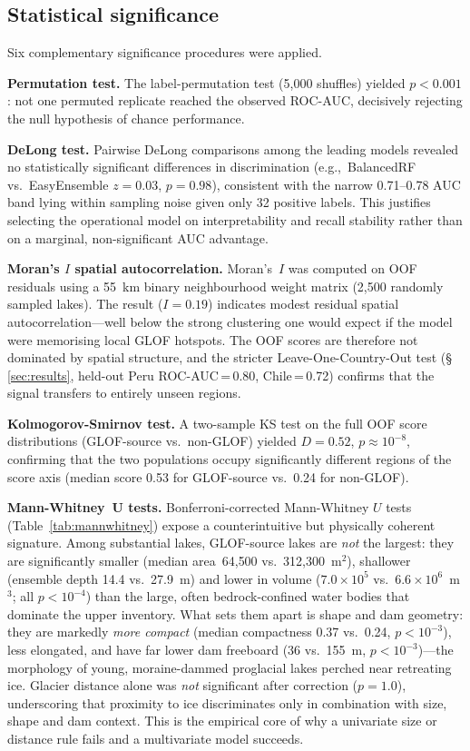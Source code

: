 \documentclass[pdflatex,sn-basic]{sn-jnl}%
\begin{document}
\subsection{Statistical significance}
\label{sec:stats}

Six complementary significance procedures were applied.

\textbf{Permutation test.}
The label-permutation test (5{,}000 shuffles) yielded $p<0.001$: not one
permuted replicate reached the observed ROC-AUC, decisively rejecting the
null hypothesis of chance performance.

\textbf{DeLong test.}
Pairwise DeLong comparisons \citep{DeLong1988} among the leading models
revealed no statistically significant differences in discrimination
(e.g.,\ BalancedRF vs.\ EasyEnsemble $z\!=\!0.03$, $p\!=\!0.98$),
consistent with the narrow 0.71--0.78 AUC band lying within sampling noise
given only 32 positive labels. This justifies selecting the operational
model on interpretability and recall stability rather than on a marginal,
non-significant AUC advantage.

\textbf{Moran's $I$ spatial autocorrelation.}
Moran's~$I$ was computed on OOF residuals using a 55~km binary
neighbourhood weight matrix (2{,}500 randomly sampled lakes).
The result ($I\!=\!0.19$) indicates modest residual spatial
autocorrelation---well below the strong clustering one
would expect if the model were memorising local GLOF hotspots. The OOF
scores are therefore not dominated by spatial structure, and the stricter
Leave-One-Country-Out test (\S\,\ref{sec:results}, held-out Peru
ROC-AUC\,=\,0.80, Chile\,=\,0.72) confirms that the signal transfers to
entirely unseen regions.

\textbf{Kolmogorov-Smirnov test.}
A two-sample KS test on the full OOF score distributions
(GLOF-source vs.\ non-GLOF) yielded $D\!=\!0.52$,
$p\!\approx\!10^{-8}$, confirming that the two populations occupy
significantly different regions of the score axis
(median score 0.53 for GLOF-source vs.\ 0.24 for non-GLOF).

\textbf{Mann-Whitney~U tests.}
Bonferroni-corrected Mann-Whitney $U$ tests
(Table~\ref{tab:mannwhitney}) expose a counterintuitive but physically
coherent signature. Among substantial lakes, GLOF-source lakes are
\emph{not} the largest: they are significantly smaller (median
area~64{,}500 vs.\ 312{,}300~m$^2$), shallower (ensemble depth 14.4 vs.\
27.9~m) and lower in volume ($7.0{\times}10^5$ vs.\ $6.6{\times}10^6$~m$^3$;
all $p<10^{-4}$) than the large, often bedrock-confined water bodies that
dominate the upper inventory. What sets them apart is shape and dam
geometry: they are markedly \emph{more compact} (median compactness 0.37
vs.\ 0.24, $p<10^{-3}$), less elongated, and have far lower dam freeboard
(36 vs.\ 155~m, $p<10^{-3}$)---the morphology of young, moraine-dammed
proglacial lakes perched near retreating ice. Glacier distance alone was
\emph{not} significant after correction ($p\!=\!1.0$), underscoring that
proximity to ice discriminates only in combination with size, shape and
dam context. This is the empirical core of why a univariate size or
distance rule fails and a multivariate model succeeds.
\end{document}
